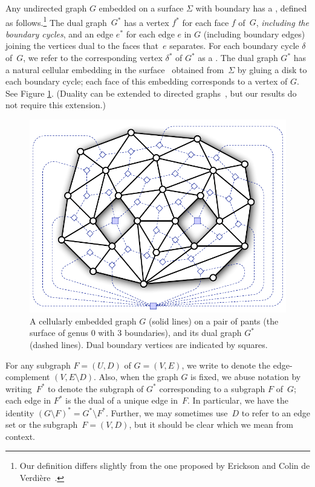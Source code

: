 \documentclass[letterpaper,review]{siamart190516}
\begin{document}
Any undirected graph $G$ embedded on a surface $\Sigma$ with boundary has a , defined as follows.\footnote{Our definition differs slightly from the one proposed by Erickson and Colin de Verdière~\cite{ce-tnpcs-10}.}  The dual graph~$G^*$ has a vertex $f^*$ for each face $f$ of~$G$, \emph{including the boundary cycles}, and an edge $e^*$ for each edge $e$ in $G$ (including boundary edges) joining the vertices dual to the faces that~$e$ separates.  For each boundary cycle $\delta$ of~$G$, we refer to the corresponding vertex $\delta^*$ of $G^*$ as a .  The dual graph $G^*$ has a natural cellular embedding in the surface~\EMPH{$\Sigma^\bullet$} obtained from~$\Sigma$ by gluing a disk to each boundary cycle; each face of this embedding corresponds to a vertex of $G$.  See Figure \ref{fig:duality}.  (Duality can be extended to directed graphs~\cite{cen-hfcc-12}, but our results do not require this extension.)

\begin{figure}[htb]
\centering
\includegraphics[scale=0.45]{Fig/pants}
\caption{A cellularly embedded graph $G$ (solid lines) on a pair of pants (the surface of genus 0 with 3 boundaries), and its dual graph $G^*$ (dashed lines).  Dual boundary vertices are indicated by squares.}
\label{fig:duality}
\end{figure}
 
For any subgraph $F = (U,D)$ of $G = (V,E)$, we write  to denote the edge-complement $(V, {E\setminus D})$.  Also, when the graph $G$ is fixed, we abuse notation by writing~$F^*$ to denote the subgraph of $G^*$ corresponding to a subgraph $F$ of~$G$; each edge in $F^*$ is the dual of a unique edge in~$F$.  In particular, we have the identity $(G\setminus F)^* = G^* \setminus F^*$.
Further, we may sometimes use~$D$ to refer to an edge set or the subgraph~$F = (V, D)$,
but it should be clear which we mean from context.
\end{document}
